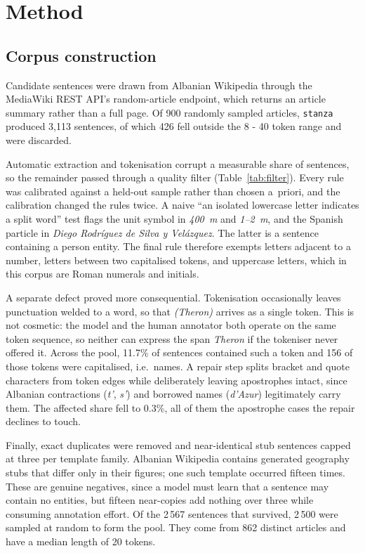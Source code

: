 \section{Method}
\label{sec:method}

\subsection{Corpus construction}
\label{sec:method:corpus}

Candidate sentences were drawn from Albanian Wikipedia through the MediaWiki REST API's random-article endpoint, which returns an article summary rather than a full page. Of 900 randomly sampled articles, \texttt{stanza}~\cite{bib:stanza} produced 3,113 sentences, of which 426 fell outside the 8 - 40 token range and were discarded.

Automatic extraction and tokenisation corrupt a measurable share of sentences, so the remainder passed through a quality filter (Table~\ref{tab:filter}). Every rule was calibrated against a held-out sample rather than chosen a~priori, and the calibration changed the rules twice. A naive ``an isolated lowercase letter indicates a split word'' test flags the unit symbol in \emph{400~m} and \emph{1--2~m}, and the Spanish particle in \emph{Diego Rodríguez de Silva y Velázquez}. The latter is a sentence containing a person entity. The final rule therefore exempts letters adjacent to a number, letters between two capitalised tokens, and uppercase letters, which in this corpus are Roman numerals and initials.

A separate defect proved more consequential. Tokenisation occasionally leaves punctuation welded to a word, so that \emph{(Theron)} arrives as a single token. This is not cosmetic: the model and the human annotator both operate on the same token sequence, so neither can express the span \emph{Theron} if the tokeniser never offered it. Across the pool, 11.7\% of sentences contained such a token and 156 of those tokens were capitalised, i.e.\ names. A repair step splits bracket and quote characters from token edges while deliberately leaving apostrophes intact, since Albanian contractions (\emph{t'}, \emph{s'}) and borrowed names (\emph{d'Azur}) legitimately carry them. The affected share fell to 0.3\%, all of them the apostrophe cases the repair declines to touch.

Finally, exact duplicates were removed and near-identical stub sentences capped at three per template family. Albanian Wikipedia contains generated geography stubs that differ only in their figures; one such template occurred fifteen times. These are genuine negatives, since a model must learn that a sentence may contain no entities, but fifteen near-copies add nothing over three while consuming annotation effort. Of the 2\,567 sentences that survived, 2\,500 were sampled at random to form the pool. They come from 862 distinct articles and have a median length of 20 tokens.

